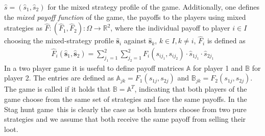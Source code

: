 \documentclass[12pt]{article}
\newcommand{\sthuga}{Stag hunt game}
\newcommand{\realnumb}{\mathbb{R}}
\newcommand{\stu}{s}
\newcommand{\pay}{F}
\newcommand{\sprob}{\hat{s}}
\newcommand{\svec}{\vec{\sprob}}
\renewcommand{\vec}{\mathbf}
\newcommand{\mixpay}{\hat{\pay}}
\newcommand{\mixstratspace}{\Omega}
\newcommand{\payma}{\mathbb{A}}
\begin{document}
$\sprob = \left(\sprob_1,\sprob_2\right)$ for the mixed strategy profile of 
the game. 
Additionally, one defines the \textit{mixed payoff function} of the game,
the payoffs to the players using mixed strategies as 
$\mixpay: (\mixpay_1,\mixpay_2): \mixstratspace \rightarrow \realnumb^2$, 
where the individual payoff to player $i \in I$ choosing the mixed-strategy 
profile $\svec_i$ against $\svec_k$,  $k \in I, k \neq i$, $\mixpay_i$ is 
defined as
\begin{align}
        \mixpay_i(\svec_1,\svec_2) = \sum_{j_{1}=1}^{2} \sum_{j_{2}=1}^{2} 
        \pay_{i}(\stu_{i{j_1}},\stu_{i{j_2}}) \cdot \sprob_{1j_1} \cdot 
        \sprob_{2j_1}
\end{align}
In a two player game it is useful to define payoff matrices $\payma$ for player
1 and $\mathbb{B}$ for player 2. The entries are defined as $\payma_{jk} = 
\pay_1(s_{1j},s_{2j})$ and $\mathbb{B}_{jk} = \pay_2(s_{1j},s_{2j})$. 
The game is called  if it holds that $\mathbb{B} = \payma^T$,
indicating that both players of the game choose from the same set of strategies
and face the same payoffs. In the \sthuga\ this is clearly the case as both
hunters choose from two pure strategies and we assume that both receive the
same payoff from selling their loot. 
\end{document}
